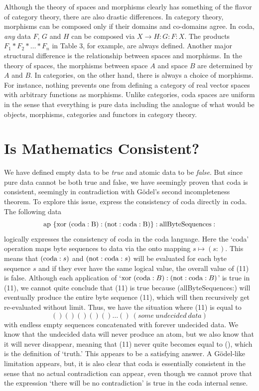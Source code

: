 \documentclass[11pt]{article}
\begin{document}
    Although the theory of spaces and morphisms clearly has something of the flavor of category theory, there are
also drastic differences.  In category theory, morphisms can be composed only if their domains and co-domains
agree.  In coda, {\it any} data $F$, $G$ and $H$ can be composed via
$X\rightarrow H:G:F:X$.  The products $F_1*F_2*\dots *F_n$ in Table 3,
for example, are always defined.  Another major structural difference
is the relationship between spaces and morphisms.  In the theory of spaces, the morphisms between space
$A$ and space $B$ are determined by $A$ and $B$.  In categories, on the other hand, there is always a choice of morphisms.  
For instance, nothing prevents one from defining a category
of real vector spaces with arbitrary functions as morphisms.  Unlike categories, coda spaces are
uniform in the sense that everything is pure data including the analogue of what would be objects, morphisms,
categories and functors in category theory.  

\section{Is Mathematics Consistent?}

     We have defined empty data to be {\it true} and atomic data to be {\it false}.  But since pure data
cannot be both true and false, we have seemingly proven that coda is consistent, seemingly
in contradiction with G\"{o}del's second incompleteness theorem.  To explore this issue,
express the consistency of coda directly in coda.  The following data
\begin{equation}\label{eqn}
{\rm ap\ \{xor\ (coda:B) : (not:coda:B) \} : allByteSequences :}
\end{equation}
logically expresses the consistency of coda in the coda language.  Here the `coda' operation maps
byte sequences to data via the onto mapping $s\mapsto (s:)$.  This means that $({\rm coda}:s)$ and
$({\rm not}:{\rm coda}:s)$ will be evaluated for each byte sequence $s$ and if they ever have the same logical
value, the overall value of (11) is false.   Although each application of `${\rm xor}\ ({\rm coda}:B) : ({\rm not}:{\rm coda}:B)$'
is true in (11), we cannot quite conclude that (11) is true because (allByteSequences:) will
eventually produce the entire byte sequence (11), which will then recursively get re-evaluated
without limit.  Thus, we have the situation where (11) is equal to
\begin{equation}\label{eqn}
() () () () () \dots ()\  (some\ undecided\ data)
\end{equation}
with endless empty sequences concatenated with forever undecided data.
We know that the undecided data will never produce an atom, but we also know that it will never disappear,
meaning that (11) never quite becomes equal to (), which is the definition of `truth.'  This appears
to be a satisfying answer.  A G\"{o}del-like limitation appears, but, it is also clear that coda
is essentially consistent in the sense that no actual contradiction can appear, even though we
cannot prove that the expression `there will be no contradiction' is true in the coda internal sense.
\end{document}
